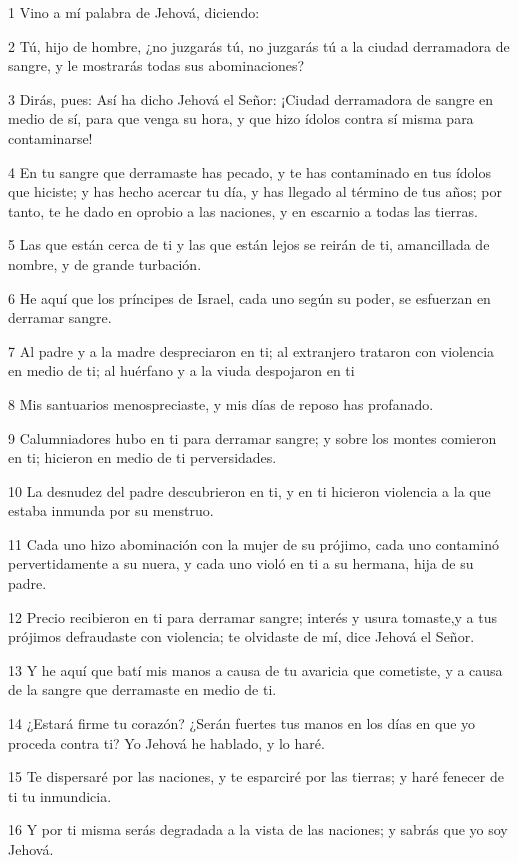 \par 1 Vino a mí palabra de Jehová, diciendo:
\par 2 Tú, hijo de hombre, ¿no juzgarás tú, no juzgarás tú a la ciudad derramadora de sangre, y le mostrarás todas sus abominaciones?
\par 3 Dirás, pues: Así ha dicho Jehová el Señor: ¡Ciudad derramadora de sangre en medio de sí, para que venga su hora, y que hizo ídolos contra sí misma para contaminarse!
\par 4 En tu sangre que derramaste has pecado, y te has contaminado en tus ídolos que hiciste; y has hecho acercar tu día, y has llegado al término de tus años; por tanto, te he dado en oprobio a las naciones, y en escarnio a todas las tierras.
\par 5 Las que están cerca de ti y las que están lejos se reirán de ti, amancillada de nombre, y de grande turbación.
\par 6 He aquí que los príncipes de Israel, cada uno según su poder, se esfuerzan en derramar sangre.
\par 7 Al padre y a la madre despreciaron en ti; al extranjero trataron con violencia en medio de ti; al huérfano y a la viuda despojaron en ti 
\par 8 Mis santuarios menospreciaste, y mis días de reposo has profanado. 
\par 9 Calumniadores hubo en ti para derramar sangre; y sobre los montes comieron en ti; hicieron en medio de ti perversidades.
\par 10 La desnudez del padre descubrieron en ti, y en ti hicieron violencia a la que estaba inmunda por su menstruo.
\par 11 Cada uno hizo abominación con la mujer de su prójimo, cada uno contaminó pervertidamente a su nuera, y cada uno violó en ti a su hermana, hija de su padre. 
\par 12 Precio recibieron en ti para derramar sangre; interés y usura tomaste,y a tus prójimos defraudaste con violencia; te olvidaste de mí, dice Jehová el Señor.
\par 13 Y he aquí que batí mis manos a causa de tu avaricia que cometiste, y a causa de la sangre que derramaste en medio de ti.
\par 14 ¿Estará firme tu corazón? ¿Serán fuertes tus manos en los días en que yo proceda contra ti? Yo Jehová he hablado, y lo haré.
\par 15 Te dispersaré por las naciones, y te esparciré por las tierras; y haré fenecer de ti tu inmundicia.
\par 16 Y por ti misma serás degradada a la vista de las naciones; y sabrás que yo soy Jehová.

